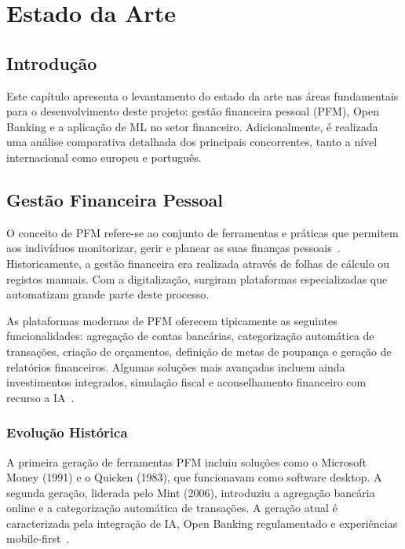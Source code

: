 \chapter{Estado da Arte}
\label{chap:estado-arte}

\section{Introdução}
\label{sec:ea-intro}

Este capítulo apresenta o levantamento do estado da arte nas áreas fundamentais para o desenvolvimento deste projeto: gestão financeira pessoal (\ac{PFM}), Open Banking e a aplicação de \ac{ML} no setor financeiro. Adicionalmente, é realizada uma análise comparativa detalhada dos principais concorrentes, tanto a nível internacional como europeu e português.

\section{Gestão Financeira Pessoal}
\label{sec:ea-pfm}

O conceito de \ac{PFM} refere-se ao conjunto de ferramentas e práticas que permitem aos indivíduos monitorizar, gerir e planear as suas finanças pessoais~\cite{pfm2023}. Historicamente, a gestão financeira era realizada através de folhas de cálculo ou registos manuais. Com a digitalização, surgiram plataformas especializadas que automatizam grande parte deste processo.

As plataformas modernas de \ac{PFM} oferecem tipicamente as seguintes funcionalidades: agregação de contas bancárias, categorização automática de transações, criação de orçamentos, definição de metas de poupança e geração de relatórios financeiros. Algumas soluções mais avançadas incluem ainda investimentos integrados, simulação fiscal e aconselhamento financeiro com recurso a \ac{IA}~\cite{fintech2024}.

\subsection{Evolução Histórica}

A primeira geração de ferramentas \ac{PFM} incluiu soluções como o Microsoft Money (1991) e o Quicken (1983), que funcionavam como software desktop. A segunda geração, liderada pelo Mint (2006), introduziu a agregação bancária online e a categorização automática de transações. A geração atual é caracterizada pela integração de \ac{IA}, Open Banking regulamentado e experiências mobile-first~\cite{pfm-evolution2024}.

